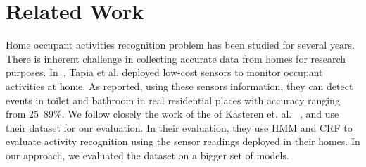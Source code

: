 \section{Related Work}

Home occupant activities recognition problem has been studied for several years. There is inherent challenge in collecting accurate data from homes for research purposes. In~\cite{emtapia}, Tapia et al. deployed low-cost sensors to monitor occupant activities at home. As reported, using these sensors information, they can detect events in toilet and bathroom in real residential places with accuracy ranging from 25~89\%. 
We follow closely the work of the of Kasteren et. al. ~\cite{tvkasteren}, and use their dataset for our evaluation. In their evaluation, they use HMM and CRF to evaluate activity recognition using the sensor readings deployed in their homes. In our approach, we evaluated the dataset on a bigger set of models. 



